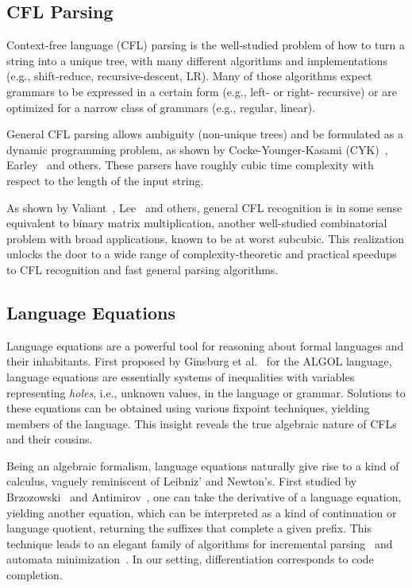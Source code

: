 \documentclass[sigplan,review,anonymous,acmsmall]{acmart}\settopmatter{printfolios=false,printccs=false,printacmref=false}
\begin{document}
\subsection{CFL Parsing}

Context-free language (CFL) parsing is the well-studied problem of how to turn a string into a unique tree, with many different algorithms and implementations (e.g., shift-reduce, recursive-descent, LR). Many of those algorithms expect grammars to be expressed in a certain form (e.g., left- or right- recursive) or are optimized for a narrow class of grammars (e.g., regular, linear).

General CFL parsing allows ambiguity (non-unique trees) and be formulated as a dynamic programming problem, as shown by Cocke-Younger-Kasami (CYK)~\cite{sakai1961syntax}, Earley~\cite{earley1970efficient} and others. These parsers have roughly cubic time complexity with respect to the length of the input string.

As shown by Valiant~\cite{valiant1975general}, Lee~\cite{lee2002fast} and others, general CFL recognition is in some sense equivalent to binary matrix multiplication, another well-studied combinatorial problem with broad applications, known to be at worst subcubic. This realization unlocks the door to a wide range of complexity-theoretic and practical speedups to CFL recognition and fast general parsing algorithms.



\subsection{Language Equations}

Language equations are a powerful tool for reasoning about formal languages and their inhabitants. First proposed by Ginsburg et al.~\cite{ginsburg1962two} for the ALGOL language, language equations are essentially systems of inequalities with variables representing \textit{holes}, i.e., unknown values, in the language or grammar. Solutions to these equations can be obtained using various fixpoint techniques, yielding members of the language. This insight reveals the true algebraic nature of CFLs and their cousins.

Being an algebraic formalism, language equations naturally give rise to a kind of calculus, vaguely reminiscent of Leibniz' and Newton's. First studied by Brzozowski~\cite{brzozowski1964derivatives, brzozowski1980equations} and Antimirov~\cite{antimirov1996partial}, one can take the derivative of a language equation, yielding another equation, which can be interpreted as a kind of continuation or language quotient, returning the suffixes that complete a given prefix. This technique leads to an elegant family of algorithms for incremental parsing~\cite{might2011parsing, adams2016complexity} and automata minimization~\cite{brzozowski1962canonical}. In our setting, differentiation corresponds to code completion.
\end{document}
